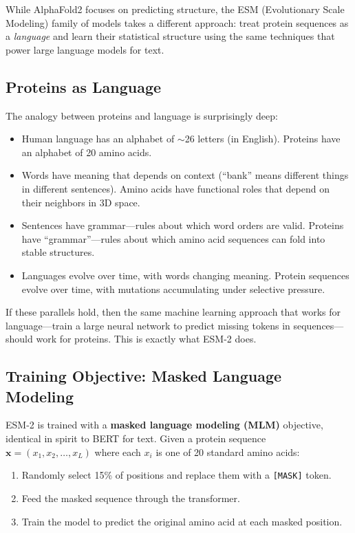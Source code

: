 While AlphaFold2 focuses on predicting structure, the ESM (Evolutionary Scale Modeling) family of models takes a different approach: treat protein sequences as a \emph{language} and learn their statistical structure using the same techniques that power large language models for text.

\subsection{Proteins as Language}

The analogy between proteins and language is surprisingly deep:

\begin{itemize}[leftmargin=1.5em]
  \item Human language has an alphabet of $\sim$26 letters (in English). Proteins have an alphabet of 20 amino acids.
  \item Words have meaning that depends on context (``bank'' means different things in different sentences). Amino acids have functional roles that depend on their neighbors in 3D space.
  \item Sentences have grammar---rules about which word orders are valid. Proteins have ``grammar''---rules about which amino acid sequences can fold into stable structures.
  \item Languages evolve over time, with words changing meaning. Protein sequences evolve over time, with mutations accumulating under selective pressure.
\end{itemize}

If these parallels hold, then the same machine learning approach that works for language---train a large neural network to predict missing tokens in sequences---should work for proteins. This is exactly what ESM-2 does.

\subsection{Training Objective: Masked Language Modeling}

ESM-2 \citep{lin2023} is trained with a \textbf{masked language modeling (MLM)} objective, identical in spirit to BERT for text. Given a protein sequence $\mathbf{x} = (x_1, x_2, \ldots, x_L)$ where each $x_i$ is one of 20 standard amino acids:

\begin{enumerate}[leftmargin=1.8em]
  \item Randomly select 15\% of positions and replace them with a \texttt{[MASK]} token.
  \item Feed the masked sequence through the transformer.
  \item Train the model to predict the original amino acid at each masked position.
\end{enumerate}

